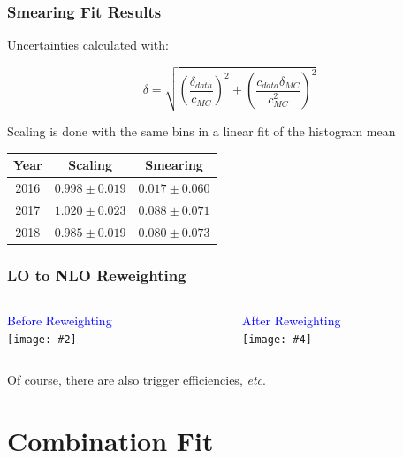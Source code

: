 \documentclass{beamer}
\newcommand{\twofigs}[4]{
  \begin{columns}
    \begin{column}{0.5\linewidth}
      \centering
      \textcolor{blue}{#1} \\
      \texttt{[image: \#2]}
    \end{column}
    \begin{column}{0.5\linewidth}
      \centering
      \textcolor{blue}{#3} \\
      \texttt{[image: \#4]}
    \end{column}
  \end{columns}
}
\begin{document}
\begin{frame}
  \frametitle{Smearing Fit Results}

  Uncertainties calculated with:

  \[
  \delta = \sqrt{\left(\frac{\delta_{data}}{c_{MC}}\right)^2 +
    \left(\frac{c_{data}\delta_{MC}}{c_{MC}^2}\right)^2}
  \]

  \vfill

  Scaling is done with the same bins in a linear fit of the histogram mean

  \vfill

  \begin{center}
    \begin{tabular}{c|c|c}
      \hline
      Year & Scaling & Smearing \\
      \hline
      2016 & $0.998 \pm 0.019$ & $0.017 \pm 0.060$ \\
      2017 & $1.020 \pm 0.023$ & $0.088 \pm 0.071$ \\
      2018 & $0.985 \pm 0.019$ & $0.080 \pm 0.073$ \\
      \hline
    \end{tabular}
  \end{center}


\end{frame}

\begin{frame}
  \frametitle{LO to NLO Reweighting}

  \twofigs{Before Reweighting}
          {figures/Vjets_NLOreweighting_2017V5_Znn_withoutWeight.pdf}
          {After Reweighting}
          {figures/Vjets_NLOreweighting_2017V5_Znn_withWeight.pdf}

  Of course, there are also trigger efficiencies, \emph{etc}.

\end{frame}

\section{Combination Fit}
\end{document}
